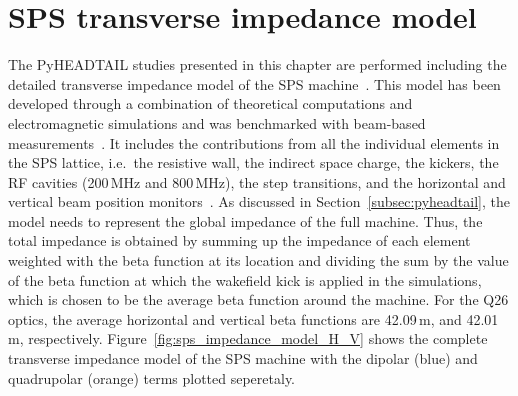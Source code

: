 \section{SPS transverse impedance model}\label{sec:sps_impedance_model}
The PyHEADTAIL studies presented in this chapter are performed including the detailed transverse impedance model of the SPS machine~\cite{sps_impedance_model_git}. This model has been developed through a combination of theoretical computations and electromagnetic simulations and was benchmarked with beam-based measurements~\cite{Salvant:1274254, Zannini:1561199, Salvant:1271349, Zannini:2141779}. 
It includes the contributions from all the individual elements in the SPS lattice, i.e.~the resistive wall, the indirect space charge, the kickers, the RF cavities (200\,MHz and 800\,MHz), the step transitions, and the horizontal and vertical beam position monitors~\cite{Zannini:2141779}. As discussed in  Section~\ref{subsec:pyheadtail}, the model needs to represent the global impedance of the full machine. Thus, the total impedance is obtained by summing up the impedance of each element weighted with the beta function at its location and dividing the sum by the value of the beta function at which the wakefield kick is applied in the simulations, which is chosen to be the average beta function around the machine. For the Q26 optics, the average horizontal and vertical beta functions are 42.09\,m, and 42.01\,m, respectively.
Figure~\ref{fig:sps_impedance_model_H_V} shows the complete transverse impedance model of the SPS machine with the dipolar (blue) and quadrupolar (orange) terms plotted seperetaly. 

